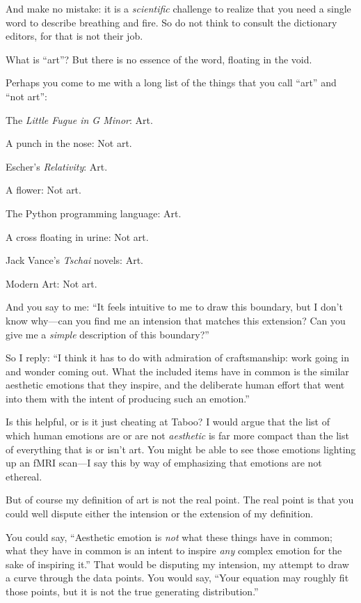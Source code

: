 {
 And make no mistake: it is a \textit{scientific} challenge to
realize that you need a single word to describe breathing and fire. So
do not think to consult the dictionary editors, for that is not their
job.}

{
 What is ``art''? But there is
no essence of the word, floating in the void.}

{
 Perhaps you come to me with a long list of the things that you
call ``art'' and
``not art'':}

{
 The \textit{Little Fugue in G Minor}: Art.}

{
 A punch in the nose: Not art.}

{
 Escher's \textit{Relativity}: Art.}

{
 A flower: Not art.}

{
 The Python programming language: Art.}

{
 A cross floating in urine: Not art.}

{
 Jack Vance's \textit{Tschai} novels: Art.}

{
 Modern Art: Not art.}

{
 And you say to me: ``It feels intuitive to me to
draw this boundary, but I don't know why---can you find
me an intension that matches this extension? Can you give me a
\textit{simple} description of this boundary?''}

{
 So I reply: ``I think it has to do with
admiration of craftsmanship: work going in and wonder coming out. What
the included items have in common is the similar aesthetic emotions
that they inspire, and the deliberate human effort that went into them
with the intent of producing such an emotion.''}

{
 Is this helpful, or is it just cheating at Taboo? I would argue
that the list of which human emotions are or are not \textit{aesthetic}
is far more compact than the list of everything that is or
isn't art. You might be able to see those emotions
lighting up an fMRI scan---I say this by way of emphasizing that
emotions are not ethereal.}

{
 But of course my definition of art is not the real point. The real
point is that you could well dispute either the intension or the
extension of my definition.}

{
 You could say, ``Aesthetic emotion is
\textit{not} what these things have in common; what they have in common
is an intent to inspire \textit{any} complex emotion for the sake of
inspiring it.'' That would be disputing my intension,
my attempt to draw a curve through the data points. You would say,
``Your equation may roughly fit those points, but it
is not the true generating distribution.''}

